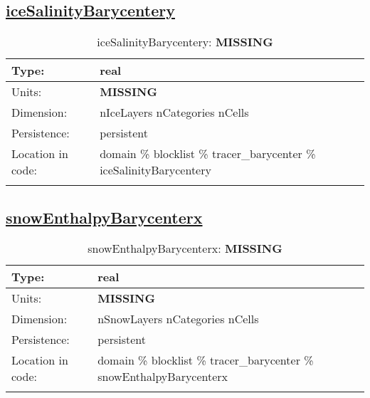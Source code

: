 \subsection[iceSalinityBarycentery]{\hyperref[sec:var_tab_tracer_barycenter]{iceSalinityBarycentery}}
\label{subsec:var_sec_tracer_barycenter_iceSalinityBarycentery}
\begin{center}
\begin{longtable}{| p{2.0in} | p{4.0in} |}
        \hline 
        Type: & real \\
        \hline 
        Units: & {\bf \color{red} MISSING} \\
        \hline 
        Dimension: & nIceLayers nCategories nCells \\
        \hline 
        Persistence: & persistent \\
        \hline 
         Location in code: & domain \% blocklist \% tracer\_barycenter \% iceSalinityBarycentery \\
         \hline 
    \caption{iceSalinityBarycentery: {\bf \color{red} MISSING}}
\end{longtable}
\end{center}
\subsection[snowEnthalpyBarycenterx]{\hyperref[sec:var_tab_tracer_barycenter]{snowEnthalpyBarycenterx}}
\label{subsec:var_sec_tracer_barycenter_snowEnthalpyBarycenterx}
\begin{center}
\begin{longtable}{| p{2.0in} | p{4.0in} |}
        \hline 
        Type: & real \\
        \hline 
        Units: & {\bf \color{red} MISSING} \\
        \hline 
        Dimension: & nSnowLayers nCategories nCells \\
        \hline 
        Persistence: & persistent \\
        \hline 
         Location in code: & domain \% blocklist \% tracer\_barycenter \% snowEnthalpyBarycenterx \\
         \hline 
    \caption{snowEnthalpyBarycenterx: {\bf \color{red} MISSING}}
\end{longtable}
\end{center}

